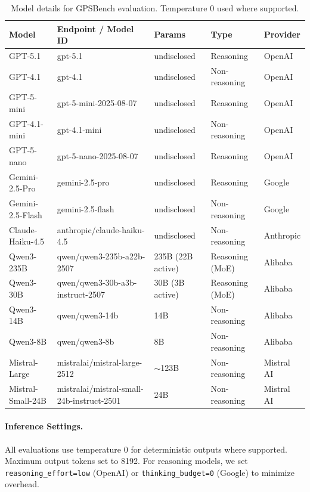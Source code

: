 \begin{table}[h]
\centering
\caption{Model details for GPSBench evaluation. Temperature 0 used where supported.}
\label{tab:model_details}
\small
\begin{tabular}{lllll}
\toprule
\textbf{Model} & \textbf{Endpoint / Model ID} & \textbf{Params} & \textbf{Type} & \textbf{Provider} \\
\midrule
GPT-5.1 & gpt-5.1 & undisclosed & Reasoning & OpenAI \\
GPT-4.1 & gpt-4.1 & undisclosed & Non-reasoning & OpenAI \\
GPT-5-mini & gpt-5-mini-2025-08-07 & undisclosed & Reasoning & OpenAI \\
GPT-4.1-mini & gpt-4.1-mini & undisclosed & Non-reasoning & OpenAI \\
GPT-5-nano & gpt-5-nano-2025-08-07 & undisclosed & Reasoning & OpenAI \\
Gemini-2.5-Pro & gemini-2.5-pro & undisclosed & Reasoning & Google \\
Gemini-2.5-Flash & gemini-2.5-flash & undisclosed & Non-reasoning & Google \\
Claude-Haiku-4.5 & anthropic/claude-haiku-4.5 & undisclosed & Non-reasoning & Anthropic \\
Qwen3-235B & qwen/qwen3-235b-a22b-2507 & 235B (22B active) & Reasoning (MoE) & Alibaba \\
Qwen3-30B & qwen/qwen3-30b-a3b-instruct-2507 & 30B (3B active) & Reasoning (MoE) & Alibaba \\
Qwen3-14B & qwen/qwen3-14b & 14B & Non-reasoning & Alibaba \\
Qwen3-8B & qwen/qwen3-8b & 8B & Non-reasoning & Alibaba \\
Mistral-Large & mistralai/mistral-large-2512 & $\sim$123B & Non-reasoning & Mistral AI \\
Mistral-Small-24B & mistralai/mistral-small-24b-instruct-2501 & 24B & Non-reasoning & Mistral AI \\
\bottomrule
\end{tabular}
\end{table}

\paragraph{Inference Settings.} All evaluations use temperature 0 for deterministic outputs where supported. Maximum output tokens set to 8192. For reasoning models, we set \texttt{reasoning\_effort=low} (OpenAI) or \texttt{thinking\_budget=0} (Google) to minimize overhead.


